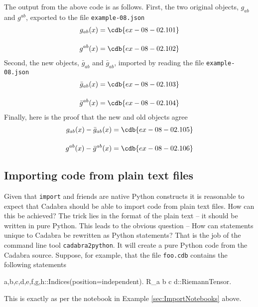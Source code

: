\documentclass[a4paper,12pt]{article}
\numberwithin{equation}{section}%
\begin{document}
The output from the above code is as follows. First, the two original objects, $g_{ab}$ and
$g^{ab}$, exported to the file \verb|example-08.json|
\begin{align*}
   g_{ab}(x) &= \cdb{ex-08-02.101}\\[10pt]
   g^{ab}(x) &= \cdb{ex-08-02.102}
\end{align*}
Second, the new objects, $\bar{g}_{ab}$ and $\bar{g}_{ab}$, imported by reading the file
\verb|example-08.json|
\begin{align*}
   {\bar{g}}_{ab}(x) &= \cdb{ex-08-02.103}\\[10pt]
   {\bar{g}}^{ab}(x) &= \cdb{ex-08-02.104}
\end{align*}
Finally, here is the proof that the new and old objects agree
\begin{align*}
   g_{ab}(x) - {\bar{g}}_{ab}(x) &= \cdb{ex-08-02.105}\\[10pt]
   g^{ab}(x) - {\bar{g}}^{ab}(x) &= \cdb{ex-08-02.106}
\end{align*}

\subsection{Importing code from plain text files}
\label{sec:ImportPlainText}

Given that \verb|import| and friends are native Python constructs it is reasonable to expect
that Cadabra should be able to import code from plain text files. How can this be achieved?
The trick lies in the format of the plain text -- it should be written in pure Python. This
leads to the obvious question -- How can statements unique to Cadabra be rewritten as Python
statements? That is the job of the command line tool \verb|cadabra2python|. It will create a
pure Python code from the Cadabra source. Suppose, for example, that the file \verb|foo.cdb|
contains the following statements
\begin{cadabra}[numbers=none]
   {a,b,c,d,e,f,g,h}::Indices(position=independent).
   R_{a b c d}::RiemannTensor.
\end{cadabra}
This is exactly as per the notebook in Example \ref{sec:ImportNotebooks} above.
\end{document}
